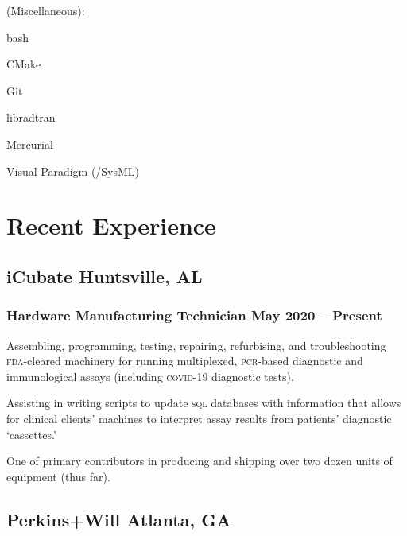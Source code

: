 \documentclass[letterpaper, oneside, 10pt]{article}
\begin{document}
\begin{multicols}{2}
{  {\jostmedium (Miscellaneous):}%
    \begin{itemize*}[%
      label=\relax, labelwidth=0pt, itemjoin=\space\char"00B7%
    ]%
      \item bash%
      \item CMake%
      \item {}%
      \item Git%
      \item {}%
      \item libradtran%
      \item Mercurial%
      \item {}%
      \item Visual Paradigm (/SysML)%
    \end{itemize*}
  }
\end{multicols}

\section*{Recent Experience} %

\hfill
\vspace{-24pt}


\subsection*{iCubate\DotSep{0.25em} Huntsville, AL}
\subsubsection*{Hardware Manufacturing Technician\DotSep{0.25em} May 2020 -- Present}

Assembling, programming, testing, repairing, refurbising, and troubleshooting
\textsc{fda}-cleared machinery for running multiplexed, \textsc{pcr}-based
diagnostic and immunological assays (including \textsc{covid}-19 diagnostic
tests).

Assisting in writing scripts to update \textsc{sql} databases with information
that allows for clinical clients' machines to interpret assay results from
patients' diagnostic `cassettes.'

One of primary contributors in producing and shipping over two dozen units of
equipment (thus far).


\subsection*{Perkins+Will\DotSep{0.25em} Atlanta, GA}
\end{document}
